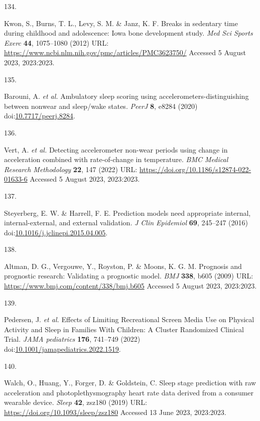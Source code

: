 \documentclass[
  10pt,
]{scrbook}
\newlength{\cslhangindent}
\newlength{\csllabelwidth}
\newlength{\cslentryspacingunit} %
\newenvironment{CSLReferences}[2] %
 {%
  \setlength{\parindent}{0pt}
  \ifodd #1
  \let\oldpar\par
  \def\par{\hangindent=\cslhangindent\oldpar}
  \fi
  \setlength{\parskip}{#2\cslentryspacingunit}
 }%
 {}
\newcommand{\CSLLeftMargin}[1]{\parbox[t]{\csllabelwidth}{#1}}
\newcommand{\CSLRightInline}[1]{\parbox[t]{\linewidth - \csllabelwidth}{#1}\break}
\begin{document}
\begin{CSLReferences}{0}{0}
\leavevmode{}%
\CSLLeftMargin{134. }%
\CSLRightInline{Kwon, S., Burns, T. L., Levy, S. M. \& Janz, K. F.
Breaks in sedentary time during childhood and adolescence: Iowa bone
development study. \emph{Med Sci Sports Exerc} \textbf{44}, 1075--1080
(2012) URL: \url{https://www.ncbi.nlm.nih.gov/pmc/articles/PMC3623750/}
Accessed 5 August 2023, 2023:2023.}

\leavevmode{}%
\CSLLeftMargin{135. }%
\CSLRightInline{Barouni, A. \emph{et al.} Ambulatory sleep scoring using
accelerometers-distinguishing between nonwear and sleep/wake states.
\emph{{PeerJ}} \textbf{8}, e8284 (2020)
doi:\href{https://doi.org/10.7717/peerj.8284}{10.7717/peerj.8284}.}

\leavevmode{}%
\CSLLeftMargin{136. }%
\CSLRightInline{Vert, A. \emph{et al.} Detecting accelerometer non-wear
periods using change in acceleration combined with rate-of-change in
temperature. \emph{{BMC} Medical Research Methodology} \textbf{22}, 147
(2022) URL: \url{https://doi.org/10.1186/s12874-022-01633-6} Accessed 5
August 2023, 2023:2023.}

\leavevmode{}%
\CSLLeftMargin{137. }%
\CSLRightInline{Steyerberg, E. W. \& Harrell, F. E. Prediction models
need appropriate internal, internal-external, and external validation.
\emph{J Clin Epidemiol} \textbf{69}, 245--247 (2016)
doi:\href{https://doi.org/10.1016/j.jclinepi.2015.04.005}{10.1016/j.jclinepi.2015.04.005}.}

\leavevmode{}%
\CSLLeftMargin{138. }%
\CSLRightInline{Altman, D. G., Vergouwe, Y., Royston, P. \& Moons, K. G.
M. Prognosis and prognostic research: Validating a prognostic model.
\emph{{BMJ}} \textbf{338}, b605 (2009) URL:
\url{https://www.bmj.com/content/338/bmj.b605} Accessed 5 August 2023,
2023:2023.}

\leavevmode{}%
\CSLLeftMargin{139. }%
\CSLRightInline{Pedersen, J. \emph{et al.} Effects of Limiting
Recreational Screen Media Use on Physical Activity and Sleep in Families
With Children: A Cluster Randomized Clinical Trial. \emph{JAMA
pediatrics} \textbf{176}, 741--749 (2022)
doi:\href{https://doi.org/10.1001/jamapediatrics.2022.1519}{10.1001/jamapediatrics.2022.1519}.}

\leavevmode{}%
\CSLLeftMargin{140. }%
\CSLRightInline{Walch, O., Huang, Y., Forger, D. \& Goldstein, C. Sleep
stage prediction with raw acceleration and photoplethysmography heart
rate data derived from a consumer wearable device. \emph{Sleep}
\textbf{42}, zsz180 (2019) URL:
\url{https://doi.org/10.1093/sleep/zsz180} Accessed 13 June 2023,
2023:2023.}


\end{CSLReferences}
\end{document}
